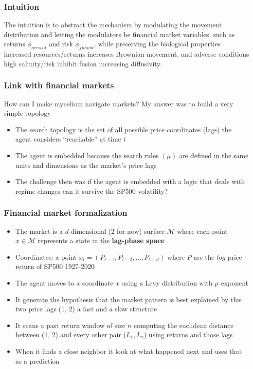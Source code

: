 \documentclass[10pt]{beamer}
\begin{document}
		\begin{frame}
			\frametitle{Intuition}
			The intuition is to abstract the mechanism by modulating the movement distribution and letting the modulators be financial market variables, such as returns $\phi_{arrival}$ and risk $\phi_{fusion}$, while preserving the biological properties increased resources/returns increases Brownian movement, and adverse conditions high salinity/risk inhibit fusion increasing diffusivity.
		\end{frame}
		
		\begin{frame}
			\frametitle{Link with financial markets}
			How can I make mycelium navigate markets?
			My answer was to build a very simple topology
			\begin{itemize}
				\item The search topology is the set of all possible price coordinates (lags) the agent considers ``reachable'' at time $t$
				\item The agent is embedded because the search rules $(\mu)$ are defined in the same units and dimensions as the market's price lags
				\item The challenge then was if the agent is embedded with a logic that deals with regime changes can it survive the SP500 volatility?
			\end{itemize}
		\end{frame}
		
		\begin{frame}
			\frametitle{Financial market formalization}
			\begin{itemize}
				\item The market is a $d$-dimensional (2 for now) surface $\mathcal{M}$ where each point $x \in \mathcal{M}$ represents a state in the \textbf{lag-phase space}
				\item Coordinates: a point $x_{t} = (P_{t-1}, P_{t-2},\dots, P_{t-d})$ where $P$ are the $log$ price return of SP500 1927-2020
				\item The agent moves to a coordinate $x$ using a Levy distribution with $\mu$ exponent
				\item It generate the hypothesis that the market pattern is best explained by this two price lags (1, 2) a fast and a slow structure
				\item It scans a past return window of size $n$ computing the euclidean distance between (1, 2) and every other pair ($L_{1}, L_{2}$) using returns and those lags
				\item When it finds a close neighbor it look at what happened next and uses that as a prediction
			\end{itemize}
		\end{frame}
		
\end{document}
